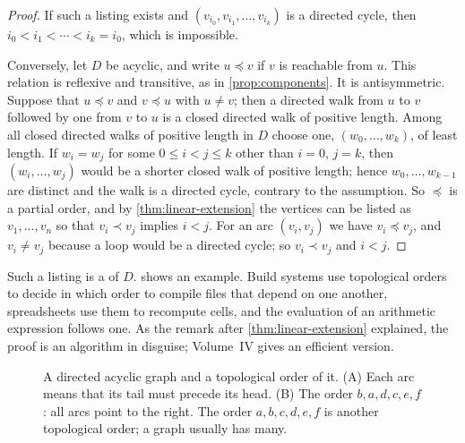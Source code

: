 \begin{proof}
If such a listing exists and $(v_{i_0},v_{i_1},\ldots,v_{i_k})$ is a directed cycle, then $i_0<i_1<\cdots<i_k=i_0$, which is impossible.

Conversely, let $D$ be acyclic, and write $u\preceq v$ if $v$ is reachable from $u$. This relation is reflexive and transitive, as in \cref{prop:components}. It is antisymmetric. Suppose that $u\preceq v$ and $v\preceq u$ with $u\ne v$; then a directed walk from $u$ to $v$ followed by one from $v$ to $u$ is a closed directed walk of positive length. Among all closed directed walks of positive length in $D$ choose one, $(w_0,\ldots,w_k)$, of least length. If $w_i=w_j$ for some $0\le i<j\le k$ other than $i=0$, $j=k$, then $(w_i,\ldots,w_j)$ would be a shorter closed walk of positive length; hence $w_0,\ldots,w_{k-1}$ are distinct and the walk is a directed cycle, contrary to the assumption. So $\preceq$ is a partial order, and by \cref{thm:linear-extension} the vertices can be listed as $v_1,\ldots,v_n$ so that $v_i\prec v_j$ implies $i<j$. For an arc $(v_i,v_j)$ we have $v_i\preceq v_j$, and $v_i\ne v_j$ because a loop would be a directed cycle; so $v_i\prec v_j$ and $i<j$.
\end{proof}

Such a listing is a  of $D$.  shows an example. Build systems use topological orders to decide in which order to compile files that depend on one another, spreadsheets use them to recompute cells, and the evaluation of an arithmetic expression follows one. As the remark after \cref{thm:linear-extension} explained, the proof is an algorithm in disguise; Volume~IV gives an efficient version.

\begin{figure}
\hfill
{}
\caption{A directed acyclic graph and a topological order of it. (A) Each arc means that its tail must precede its head. (B) The order $b,a,d,c,e,f$: all arcs point to the right. The order $a,b,c,d,e,f$ is another topological order; a graph usually has many.}
\label{fig:dag}
\end{figure}


